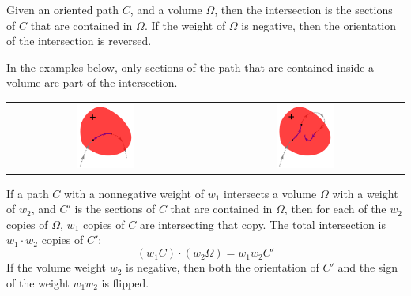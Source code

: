 Given an oriented path \(C\), and a volume \(\Omega\), then the intersection is the sections of \(C\) that are contained in \(\Omega\). If the weight of \(\Omega\) is negative, then the orientation of the intersection is reversed. %

In the examples below, only sections of the path that are contained inside a volume are part of the intersection.

\begin{center}
\begin{tabular}{cc}
\includegraphics[width = 0.3\textwidth]{Intersections/Path-volume_intersections/path_volume_intersections_example}
& 
\includegraphics[width = 0.3\textwidth]{Intersections/Path-volume_intersections/path_volume_intersections_example_2}
\end{tabular}
\end{center}

If a path \(C\) with a nonnegative weight of \(w_1\) intersects a volume \(\Omega\) with a weight of \(w_2\), and \(C'\) is the sections of \(C\) that are contained in \(\Omega\), then for each of the \(w_2\) copies of \(\Omega\), \(w_1\) copies of \(C\) are intersecting that copy. The total intersection is \(w_1 \cdot w_2\) copies of \(C'\):
\[(w_1 C) \cdot (w_2 \Omega) = w_1 w_2 C'\] 
If the volume weight \(w_2\) is negative, then both the orientation of \(C'\) and the sign of the weight \(w_1 w_2\) is flipped. 

